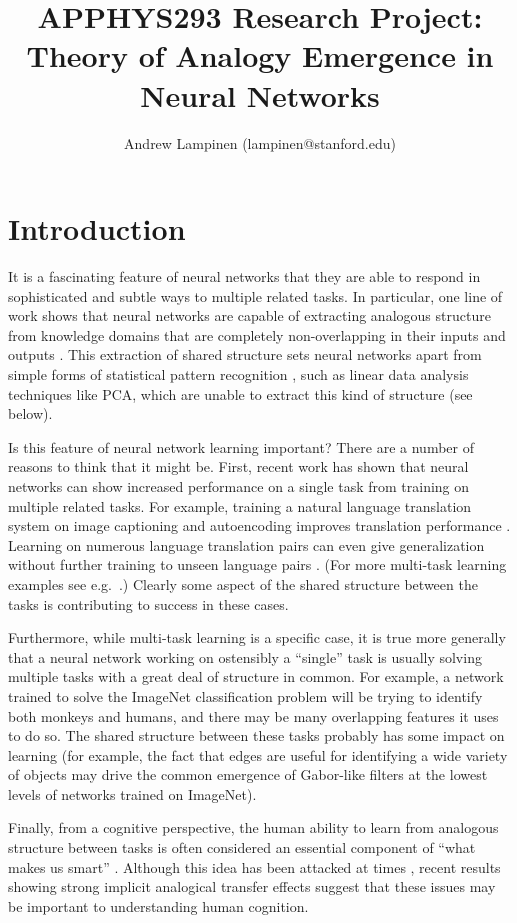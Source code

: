 \documentclass[11pt]{article}
\title{APPHYS293 Research Project: Theory of Analogy Emergence in Neural Networks}
\author{Andrew Lampinen (lampinen@stanford.edu)}
\date{}
\begin{document}
\maketitle

\section{Introduction}
It is a fascinating feature of neural networks that they are able to respond in sophisticated and subtle ways to multiple related tasks. In particular, one line of work shows that neural networks are capable of extracting analogous structure from knowledge domains that are completely non-overlapping in their inputs and outputs \citep{Hinton1986,Rogers2008a,Lampinen2017}. This extraction of shared structure sets neural networks apart from simple forms of statistical pattern recognition \citep{Rogers2008a}, such as linear data analysis techniques like PCA, which are unable to extract this kind of structure (see below). \par 
Is this feature of neural network learning important? There are a number of reasons to think that it might be. First, recent work has shown that neural networks can show increased performance on a single task from training on multiple related tasks. For example, training a natural language translation system on image captioning and autoencoding improves translation performance \citep{Luong2016}. Learning on numerous language translation pairs can even give generalization without further training to unseen language pairs \citep{Johnson2016a}. (For more multi-task learning examples see e.g.\ \citep{Dong2015,Rusu2015}.) Clearly some aspect of the shared structure between the tasks is contributing to success in these cases. \par 
Furthermore, while multi-task learning is a specific case, it is true more generally that a neural network working on ostensibly a ``single'' task is usually solving multiple tasks with a great deal of structure in common. For example, a network trained to solve the ImageNet classification problem will be trying to identify both monkeys and humans, and there may be many overlapping features it uses to do so. The shared structure between these tasks probably has some impact on learning (for example, the fact that edges are useful for identifying a wide variety of objects may drive the common emergence of Gabor-like filters at the lowest levels of networks trained on ImageNet). \par
Finally, from a cognitive perspective, the human ability to learn from analogous structure between tasks is often considered an essential component of ``what makes us smart'' \citep{Gentner2003}. Although this idea has been attacked at times \cite[e.g.]{Detterman1993}, recent results showing strong implicit analogical transfer effects \cite[e.g.]{Day2011} suggest that these issues may be important to understanding human cognition. \par
\end{document}
